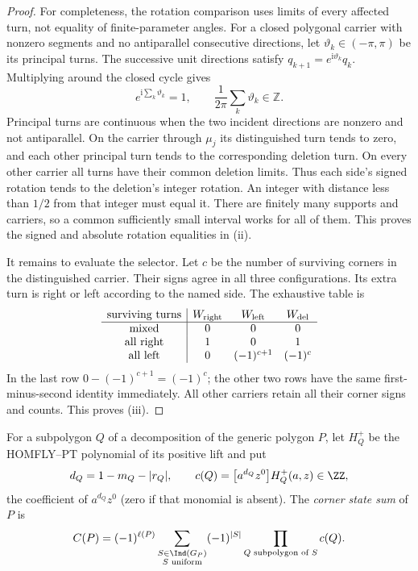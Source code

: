 \begin{proof}
For completeness, the rotation comparison uses limits of every affected
turn, not equality of finite-parameter angles. For a closed polygonal
carrier with nonzero segments and no antiparallel consecutive directions,
let $\vartheta_k\in(-\pi,\pi)$ be its principal turns. The successive
unit directions satisfy $q_{k+1}=e^{\mathrm i\vartheta_k}q_k$.
Multiplying around the closed cycle gives
\begin{equation}\label{flatpr:rotation-integer}
e^{\mathrm i\sum_k\vartheta_k}=1,\qquad
\frac1{2\pi}\sum_k\vartheta_k\in\mathbb Z.
\end{equation}
Principal turns are continuous when the two incident directions are
nonzero and not antiparallel. On the carrier through $\mu_j$ its
distinguished turn tends to zero, and each other principal turn tends
to the corresponding deletion turn. On every other carrier all turns
have their common deletion limits. Thus each side's signed rotation
tends to the deletion's integer rotation. An integer with distance
less than $1/2$ from that integer must equal it. There are finitely
many supports and carriers, so a common sufficiently small interval
works for all of them. This proves the signed and absolute rotation
equalities in (ii).

It remains to evaluate the selector. Let $c$ be the number of surviving
corners in the distinguished carrier. Their signs agree in all three
configurations. Its extra turn is right or left according to the named
side. The exhaustive table is
\begin{equation}\label{flatpr:selector-table}
\begin{array}{c|ccc}
\text{surviving turns}&W_{\rm right}&W_{\rm left}&W_{\rm del}\\\hline
\text{mixed}&0&0&0\\
\text{all right}&1&0&1\\
\text{all left}&0&(-1)^{c+1}&(-1)^c
\end{array}
\end{equation}
In the last row $0-(-1)^{c+1}=(-1)^c$; the other two rows have the
same first-minus-second identity immediately. All other carriers
retain all their corner signs and counts. This proves (iii).
\end{proof}

\begin{definition}\label{def:C}\leanok{}
For a subpolygon $Q$ of a decomposition of the generic polygon $P$, let
$H^+_Q$ be the HOMFLY--PT polynomial of its positive lift and put
\[
d_Q=1-m_Q-|r_Q|,\qquad c(Q)=\bigl[a^{d_Q}z^0\bigr]H^+_Q(a,z)\in\ZZ,
\]
the coefficient of $a^{d_Q}z^0$ (zero if that monomial is absent). The
\emph{corner state sum} of $P$ is
\[
C(P)=(-1)^{\ell(P)}\sum_{\substack{S\in\Ind(G_P)\\ S\text{ uniform}}}
(-1)^{|S|}\prod_{Q\text{ subpolygon of }S}c(Q).
\]
\end{definition}

